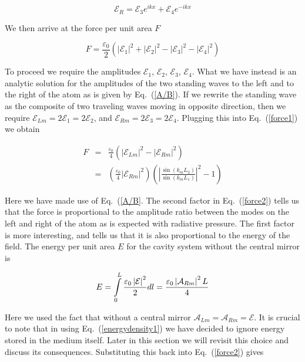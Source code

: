 \begin{equation}
\mathcal{E}_{R}=\mathcal{E}_{3}e^{ikx}+\mathcal{E}_{4}e^{-ikx}
\label{EfieldRight}
\end{equation}

We then arrive at the force per unit area $F$ 

\begin{equation}
F=\frac{\varepsilon_{0}}{2}\left(\left|\mathcal{E}_{1}\right|^{2}+\left|\mathcal{E}_{2}\right|^{2}-\left|\mathcal{E}_{3}\right|^{2}-\left|\mathcal{E}_{4}\right|^{2}\right)
\label{force1}
\end{equation}

To proceed we require the amplitudes $\mathcal{E}_{1}$, $\mathcal{E}_{2}$, $\mathcal{E}_{3}$, $\mathcal{E}_{4}$. What we have instead is an analytic solution for the amplitudes
of the two standing waves to the left and to the right of the atom as is given by Eq.\ (\ref{A/B}).
If we rewrite the standing wave as the composite of two traveling waves moving in opposite direction, then we require $\mathcal{E}_{Lm}=2\mathcal{E}_{1}=2\mathcal{E}_{2}$, and $\mathcal{E}_{Rm}=2\mathcal{E}_{3}=2\mathcal{E}_{4}$.
Plugging this into Eq.\ (\ref{force1}) we obtain

\begin{eqnarray}
F&=&\frac{\varepsilon_{0}}{4}\left(\left|\mathcal{E}_{Lm}\right|^{2}-\left|\mathcal{E}_{Rm}\right|^{2}\right)\nonumber \\ &=&\left(\frac{\varepsilon_{0}}{4}\left|\mathcal{E}_{Rm}\right|^{2}\right)\left(\left|\frac{\sin(k_{m}L_{2})}{\sin(k_{m}L_{1})}\right|^{2}-1\right)
\label{force2}
\end{eqnarray}

Here we have made use of Eq.\ (\ref{A/B}. The second factor in Eq.\ (\ref{force2}) tells us that the force is proportional to the amplitude ratio between the modes on the left and right of the atom as is expected with radiative pressure. The first factor is more interesting, and tells us that it is also proportional to the energy of the field. The energy per unit area $E$ for the cavity system without the central mirror is

\begin{equation}
E=\intop_{0}^{L}\frac{\varepsilon_{0}\left|\mathcal{E}\right|^{2}}{2}dl=\frac{\varepsilon_{0}\left|\mathcal{A}_{Rm}\right|^{2}L}{4}
\label{energydensity1}
\end{equation}
 
Here we used the fact that without a central mirror $\mathcal{A}_{Lm}=\mathcal{A}_{Rm}=\mathcal{E}$. It is crucial to note that in using Eq.\ (\ref{energydensity1}) we have decided to ignore energy stored in the medium itself.  Later in this section we will revisit this choice and discuss its consequences.  
Substituting this back into Eq.\ (\ref{force2}) gives

